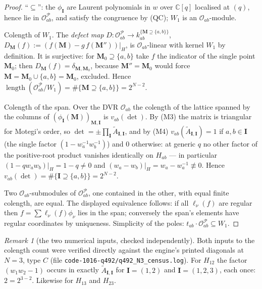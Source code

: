 \documentclass[11pt]{article}
\theoremstyle{plain}
\theoremstyle{definition}
\theoremstyle{remark}
\newtheorem{rem}[thm]{Remark}
\theoremstyle{plain}
\newcommand{\bI}{\mathbf{I}}
\newcommand{\bM}{\mathbf{M}}
\newcommand{\At}{\widetilde{A}}
\begin{document}
\begin{proof}
``$\subseteq$'': the $\phi_{\bI}$ are Laurent polynomials in $w$ over
$\mathbb{C}[q]$ localised at $(q)$, hence lie in
$\mathcal{O}_{ab}^{\mathcal{P}}$, and satisfy the congruence by (QC); $W_1$ is an
$\mathcal{O}_{ab}$-module.

Colength of $W_1$.  The \emph{defect map}
$D:\mathcal{O}_{ab}^{\mathcal{P}}\to k_{ab}^{\{\bM\supseteq\{a,b\}\}}$,
$D_{\bM}(f):=(f(\bM)-g\,f(\bM''))|_{H}$, is $\mathcal{O}_{ab}$-linear with kernel
$W_1$ by definition.  It is surjective: for $\bM_0\supseteq\{a,b\}$ take $f$ the
indicator of the single point $\bM_0$; then
$D_{\bM}(f)=\delta_{\bM,\bM_0}$, because $\bM''=\bM_0$ would force
$\bM=\bM_0\cup\{a,b\}=\bM_0$, excluded.  Hence
$\operatorname{length}(\mathcal{O}_{ab}^{\mathcal{P}}/W_1)=\#\{\bM\supseteq\{a,b\}\}=2^{N-2}$.

Colength of the span.  Over the DVR $\mathcal{O}_{ab}$ the colength of the
lattice spanned by the columns of $(\phi_{\bI}(\bM))_{\bM,\bI}$ is
$v_{ab}(\det)$.  By (M3) the matrix is triangular for Motegi's order, so
$\det=\pm\prod_{\bI}\At_{\bI,\bI}$, and by (M4)
$v_{ab}(\At_{\bI,\bI})=1$ if $a,b\in\bI$ (the single factor
$(1-w_a^{-1}w_b^{-1})$) and $0$ otherwise: at generic $q$ no other factor of the
positive-root product vanishes identically on $H_{ab}$ --- in particular
$(1-qw_aw_b)|_{H}=1-q\ne0$ and $(w_a-w_b)|_{H}=w_a-w_a^{-1}\not\equiv0$.  Hence
$v_{ab}(\det)=\#\{\bI\supseteq\{a,b\}\}=2^{N-2}$.

Two $\mathcal{O}_{ab}$-submodules of $\mathcal{O}_{ab}^{\mathcal{P}}$, one
contained in the other, with equal finite colength, are equal.  The displayed
equivalence follows: if all $\ell_\nu(f)$ are regular then
$f=\sum\ell_\nu(f)\phi_\nu$ lies in the span; conversely the span's elements have
regular coordinates by uniqueness.  Simplicity of the poles: $t_{ab}\cdot
\mathcal{O}_{ab}^{\mathcal{P}}\subseteq W_1$.
\end{proof}

\begin{rem}[the two numerical inputs, checked independently]
Both inputs to the colength count were verified directly against the engine's
printed diagonals at $N=3$, type $C$ (file
\texttt{code-1016-q492/q492\_N3\_census.log}).  For $H_{12}$ the factor
$(w_1w_2-1)$ occurs in exactly $\At_{\bI,\bI}$ for $\bI=(1,2)$ and
$\bI=(1,2,3)$, each once: $2=2^{3-2}$.  Likewise for $H_{13}$ and $H_{23}$.
\end{rem}

\end{document}
